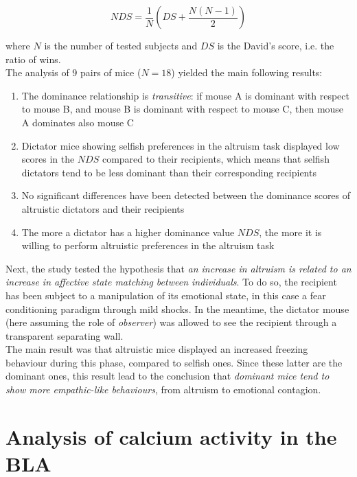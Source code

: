 \documentclass[12pt, a4paper]{report}
\begin{document}
\begin{equation}
NDS = \frac{1}{N}\left(DS + \frac{N(N-1)}{2}\right)
\end{equation}

where $N$ is the number of tested subjects and $DS$ is the David's score, i.e. the ratio of wins.\\
The analysis of 9 pairs of mice ($N=18$) yielded the main following results:

\begin{enumerate}
	\item The dominance relationship is \textit{transitive}: if mouse A is dominant with respect to mouse B, and mouse B is dominant with respect to mouse C, then mouse A dominates also mouse C 
	
	\item Dictator mice showing selfish preferences in the altruism task displayed low scores in the $NDS$ compared to their recipients, which means that selfish dictators  tend to be less dominant than their corresponding recipients
	
	\item No significant differences have been detected between the dominance scores of altruistic dictators and their recipients
	
	\item The more a dictator has a higher dominance value $NDS$, the more it is willing to perform altruistic preferences in the altruism task
	
\end{enumerate}

Next, the study tested the hypothesis that \textit{an increase in altruism is related to an increase in affective state matching between individuals}. To do so, the recipient has been subject to a manipulation of its emotional state, in this case a fear conditioning paradigm through mild shocks. In the meantime, the dictator mouse (here assuming the role of \textit{observer}) was allowed to see the recipient through a transparent separating wall.\\
The main result was that altruistic mice displayed an increased freezing behaviour during this phase, compared to selfish ones. Since these latter are the dominant ones, this result lead to the conclusion that \textit{dominant mice tend to show more empathic-like behaviours}, from altruism to emotional contagion.

\section{Analysis of calcium activity in the BLA} \label{section 4.5}
\end{document}
